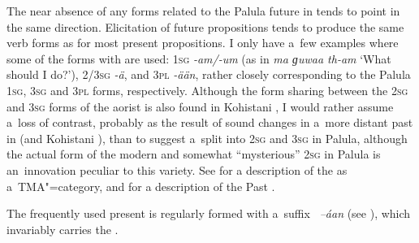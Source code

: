 \largerpage[-1]
The near absence of any forms related to the Palula future in \iliKalkoti tends to point in the same direction. Elicitation of future propositions tends to produce the same  verb forms as for most present  propositions. I only have a~few examples where some of the forms with  are used: \textsc{1sg} \textit{-am/-um} (as in \textit{ma ɡuwaa th-am} `What should I do?'), \textsc{2/3sg} \textit{-ä}, and \textsc{3pl} \textit{-ään}, rather closely corresponding to the Palula \textsc{1sg}, \textsc{3sg} and \textsc{3pl} forms, respectively. Although the form sharing between the \textsc{2sg} and \textsc{3sg} forms of the aorist is also found in Kohistani \iliShina \citep[39]{schmidt2004}, I would rather assume a~loss of contrast, probably as the result of sound changes in a~more distant past in \iliKalkoti (and Kohistani \iliShina), than to suggest a~split into \textsc{2sg} and \textsc{3sg} in Palula, although the actual form of the modern and somewhat ``mysterious'' \textsc{2sg} in Palula is an~innovation peculiar to this \iliShina variety. See  for a description of the  as a~TMA"=category, and  for a description of the Past .


 The frequently used present  is regularly formed with a~suffix
\textit{~--áan} (see ), which invariably carries the .


